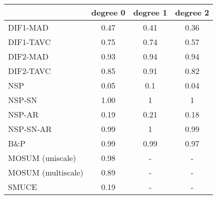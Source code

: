 \begin{tabular}{|l|c|c|c|}
  \hline
 & degree 0 & degree 1 & degree 2 \\ 
  \hline
DIF1-MAD & 0.47 & 0.41 & 0.36 \\ 
  DIF1-TAVC & 0.75 & 0.74 & 0.57 \\ 
  DIF2-MAD & 0.93 & 0.94 & 0.94 \\ 
  DIF2-TAVC & 0.85 & 0.91 & 0.82 \\ 
  NSP & 0.05 & 0.1 & 0.04 \\ 
  NSP-SN & 1.00 & 1 & 1 \\ 
  NSP-AR & 0.19 & 0.21 & 0.18 \\ 
  NSP-SN-AR & 0.99 & 1 & 0.99 \\ 
  B\&P & 0.99 & 0.99 & 0.97 \\ 
  MOSUM (uniscale) & 0.98 & - & - \\ 
  MOSUM (multiscale) & 0.89 & - & - \\ 
  SMUCE & 0.19 & - & - \\ 
   \hline
\end{tabular}
